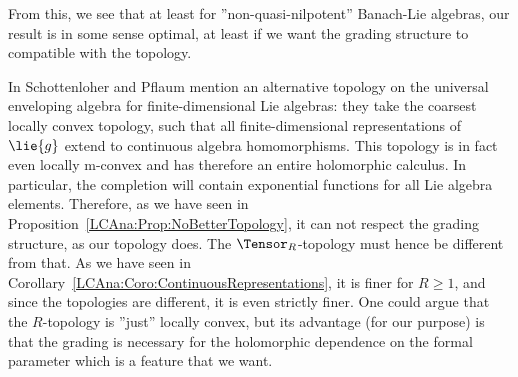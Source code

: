 From this, we see that at least for ''non-quasi-nilpotent'' Banach-Lie 
algebras, our result is in some sense optimal, at least if we want the grading 
structure to compatible with the topology.
\begin{remark}
    \label{Rem:LCAnaBCHConvergence}
    In \cite{pflaum.schottenloher:1998a} Schottenloher and Pflaum mention an 
    alternative topology on the universal enveloping algebra for 
    finite-dimensional Lie algebras: they take the coarsest locally convex 
    topology, such that all finite-dimensional representations of $\lie{g}$ 
    extend to continuous algebra homomorphisms. This topology is in fact even 
    locally m-convex and has therefore an entire holomorphic calculus. In 
    particular, the completion will contain exponential functions for all Lie 
    algebra elements. Therefore, as we have seen in 
    Proposition~\ref{LCAna:Prop:NoBetterTopology}, it can not respect the 
    grading structure, as our topology does. The $\Tensor_R$-topology must 
    hence be different from that. As we have seen in 
    Corollary~\ref{LCAna:Coro:ContinuousRepresentations}, it is finer for 
    $R \geq 1$, and since the topologies are different, it is even strictly 
    finer. One could argue that the $R$-topology is ''just'' locally convex, 
    but its advantage (for our purpose) is that the grading is necessary for 
    the holomorphic dependence on the formal parameter which is a feature that 
    we want.
\end{remark}

